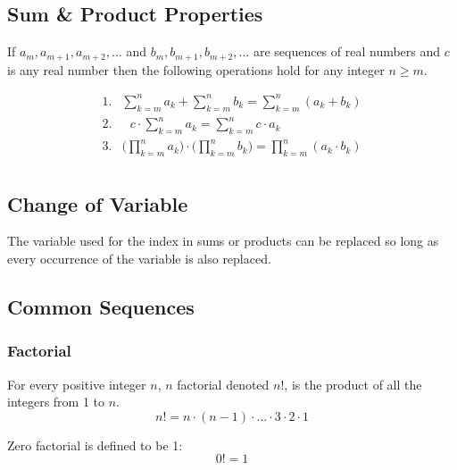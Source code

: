 \documentclass[11pt]{article}
\begin{document}
\subsection{Sum \& Product Properties}

\begin{definition}\label{def:props-sums-prods}
    If $a_m, a_{m+1}, a_{m+2}, ...$ and $b_m, b_{m+1}, b_{m+2}, ...$
    are sequences of real numbers and $c$ is any real number then
    the following operations hold for any integer $n \geq m$.

    \begin{align*}
        \text{1.} & \sum_{k=m}^n a_k + \sum_{k=m}^n b_k = \sum_{k=m}^n (a_k + b_k) \\
        \text{2.} & \text{ } c \cdot \sum_{k=m}^n a_k = \sum_{k=m}^n c \cdot a_k \\
        \text{3.} & \Biggl( \prod_{k=m}^n a_k \Biggl) \cdot \Biggl( \prod_{k=m}^n b_k \Biggl) =
                    \prod_{k=m}^n (a_k \cdot b_k) \\
    \end{align*}
\end{definition}

\subsection{Change of Variable}

The variable used for the index in sums or products can be replaced so long
as every occurrence of the variable is also replaced.

\subsection{Common Sequences}

\subsubsection{Factorial}
\begin{definition}[Factorial]\label{def:factorial}
    For every positive integer $n$, $n$ factorial denoted $n!$,
    is the product of all the integers from 1 to $n$.
    \begin{equation*}
        n! = n \cdot (n - 1) \cdot ... \cdot 3 \cdot 2 \cdot 1
    \end{equation*}
    
    Zero factorial is defined to be 1:
    \begin{equation*}
        0! = 1
    \end{equation*}
\end{definition}
\end{document}
